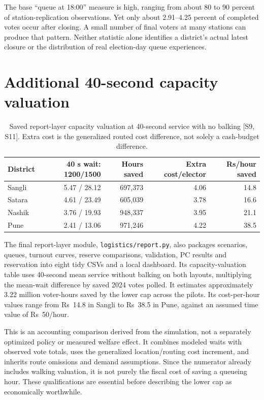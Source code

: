 \documentclass[11pt,a4paper,oneside]{report}
\newcommand{\source}[1]{\par\nopagebreak[4]{\footnotesize\color{teal}Evidence: #1.}\par}
\begin{document}
The base ``queue at 18:00'' measure is high, ranging from about 80 to 90 percent of station-replication observations. Yet only about 2.91--4.25 percent of completed votes occur after closing. A small number of final voters at many stations can produce that pattern. Neither statistic alone identifies a district's actual latest closure or the distribution of real election-day queue experiences.
\source{[S11]}

\section{Additional 40-second capacity valuation}
\begin{table}[htbp]\centering
\small
\setlength{\tabcolsep}{5pt}
\caption{Saved report-layer capacity valuation at 40-second service with no balking [S9, S11]. Extra cost is the generalized routed cost difference, not solely a cash-budget difference.}
\begin{tabular}{lrrrr}
\toprule
District & 40 s wait: 1200/1500 & Hours saved & Extra cost/elector & Rs/hour saved\\
\midrule
Sangli & 5.47 / 28.12 & 697,373 & 4.06 & 14.8\\
Satara & 4.61 / 23.49 & 605,039 & 3.78 & 16.6\\
Nashik & 3.76 / 19.93 & 948,337 & 3.95 & 21.1\\
Pune & 2.41 / 13.06 & 971,246 & 4.22 & 38.5\\
\bottomrule\end{tabular}
\end{table}
The final report-layer module, \texttt{logistics/report.py}, also packages scenarios, queues, turnout curves, reserve comparisons, validation, PC results and reservation into eight tidy CSVs and a local dashboard. Its capacity-valuation table uses 40-second mean service without balking on both layouts, multiplying the mean-wait difference by saved 2024 votes polled. It estimates approximately 3.22 million voter-hours saved by the lower cap across the pilots. Its cost-per-hour values range from Rs~14.8 in Sangli to Rs~38.5 in Pune, against an assumed time value of Rs~50/hour.

This is an accounting comparison derived from the simulation, not a separately optimized policy or measured welfare effect. It combines modeled waits with observed vote totals, uses the generalized location/routing cost increment, and inherits route omissions and demand assumptions. Since the numerator already includes walking valuation, it is not purely the fiscal cost of saving a queueing hour. These qualifications are essential before describing the lower cap as economically worthwhile.
\source{[S9], [S11], [S15]}
\end{document}
